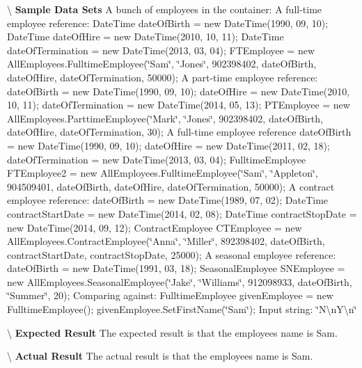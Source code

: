 \textbackslash{} {\bfseries  Sample Data Sets} A bunch of employees in the container\+: A full-\/time employee reference\+: Date\+Time date\+Of\+Birth = new Date\+Time(1990, 09, 10); Date\+Time date\+Of\+Hire = new Date\+Time(2010, 10, 11); Date\+Time date\+Of\+Termination = new Date\+Time(2013, 03, 04); F\+T\+Employee = new All\+Employees.\+Fulltime\+Employee(\char`\"{}\+Sam\char`\"{}, \char`\"{}\+Jones\char`\"{}, 902398402, date\+Of\+Birth, date\+Of\+Hire, date\+Of\+Termination, 50000); A part-\/time employee reference\+: date\+Of\+Birth = new Date\+Time(1990, 09, 10); date\+Of\+Hire = new Date\+Time(2010, 10, 11); date\+Of\+Termination = new Date\+Time(2014, 05, 13); P\+T\+Employee = new All\+Employees.\+Parttime\+Employee(\char`\"{}\+Mark\char`\"{}, \char`\"{}\+Jones\char`\"{}, 902398402, date\+Of\+Birth, date\+Of\+Hire, date\+Of\+Termination, 30); A full-\/time employee reference date\+Of\+Birth = new Date\+Time(1990, 09, 10); date\+Of\+Hire = new Date\+Time(2011, 02, 18); date\+Of\+Termination = new Date\+Time(2013, 03, 04); Fulltime\+Employee F\+T\+Employee2 = new All\+Employees.\+Fulltime\+Employee(\char`\"{}\+Sam\char`\"{}, \char`\"{}\+Appleton\char`\"{}, 904509401, date\+Of\+Birth, date\+Of\+Hire, date\+Of\+Termination, 50000); A contract employee reference\+: date\+Of\+Birth = new Date\+Time(1989, 07, 02); Date\+Time contract\+Start\+Date = new Date\+Time(2014, 02, 08); Date\+Time contract\+Stop\+Date = new Date\+Time(2014, 09, 12); Contract\+Employee C\+T\+Employee = new All\+Employees.\+Contract\+Employee(\char`\"{}\+Anna\char`\"{}, \char`\"{}\+Miller\char`\"{}, 892398402, date\+Of\+Birth, contract\+Start\+Date, contract\+Stop\+Date, 25000); A seasonal employee reference\+: date\+Of\+Birth = new Date\+Time(1991, 03, 18); Seasonal\+Employee S\+N\+Employee = new All\+Employees.\+Seasonal\+Employee(\char`\"{}\+Jake\char`\"{}, \char`\"{}\+Williams\char`\"{}, 912098933, date\+Of\+Birth, \char`\"{}\+Summer\char`\"{}, 20); Comparing against\+: Fulltime\+Employee given\+Employee = new Fulltime\+Employee(); given\+Employee.\+Set\+First\+Name(\char`\"{}\+Sam\char`\"{}); Input string\+: \char`\"{}\+N\textbackslash{}n\+Y\textbackslash{}n\char`\"{}

\textbackslash{} {\bfseries  Expected Result} The expected result is that the employee\textquotesingle{}s name is Sam.

\textbackslash{} {\bfseries  Actual Result} The actual result is that the employee\textquotesingle{}s name is Sam. \hypertarget{class_the_company_1_1_tests_1_1_select_employee_tests_a243f00fdc7457d4f3e67aadaf324f728}{}
